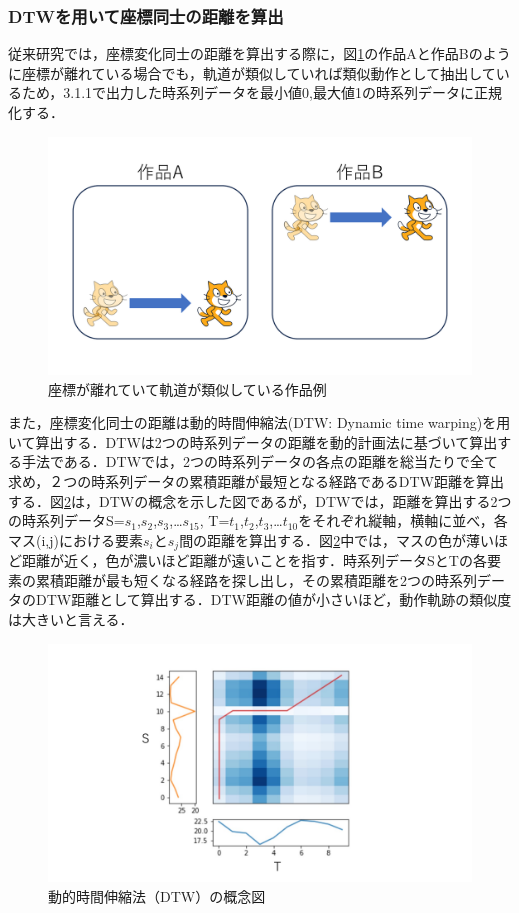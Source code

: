 \documentclass[T,J]{fose} %
\begin{document}
\subsubsection{DTWを用いて座標同士の距離を算出}

従来研究では，座標変化同士の距離を算出する際に，図\ref{fig:coordinate}の作品Aと作品Bのように座標が離れている場合でも，軌道が類似していれば類似動作として抽出しているため，3.1.1で出力した時系列データを最小値0,最大値1の時系列データに正規化する．
\begin{figure}[t]
	\centering
	\includegraphics[width=1.0\linewidth]{Okamoto_fig/coordinate.pdf}
	\caption{座標が離れていて軌道が類似している作品例}
	\label{fig:coordinate}
\end{figure}

また，座標変化同士の距離は動的時間伸縮法(DTW: Dynamic time warping)を用いて算出する．DTWは2つの時系列データの距離を動的計画法に基づいて算出する手法である．DTWでは，2つの時系列データの各点の距離を総当たりで全て求め，２つの時系列データの累積距離が最短となる経路であるDTW距離を算出する．図\ref{fig:dtw}は，DTWの概念を示した図であるが，DTWでは，距離を算出する2つの時系列データS=$s_{1}$,$s_{2}$,$s_{3}$,…$s_{15}$, T=$t_{1}$,$t_{2}$,$t_{3}$,…$t_{10}$をそれぞれ縦軸，横軸に並べ，各マス(i,j)における要素$s_{i}$と$s_{j}$間の距離を算出する．図\ref{fig:dtw}中では，マスの色が薄いほど距離が近く，色が濃いほど距離が遠いことを指す．時系列データSとTの各要素の累積距離が最も短くなる経路を探し出し，その累積距離を2つの時系列データのDTW距離として算出する．DTW距離の値が小さいほど，動作軌跡の類似度は大きいと言える．
\begin{figure}[t]
	\centering
	\includegraphics[width=1.0\linewidth]{Okamoto_fig/dtw.pdf}
	\caption{動的時間伸縮法（DTW）の概念図}
	\label{fig:dtw}
\end{figure}
\end{document}
